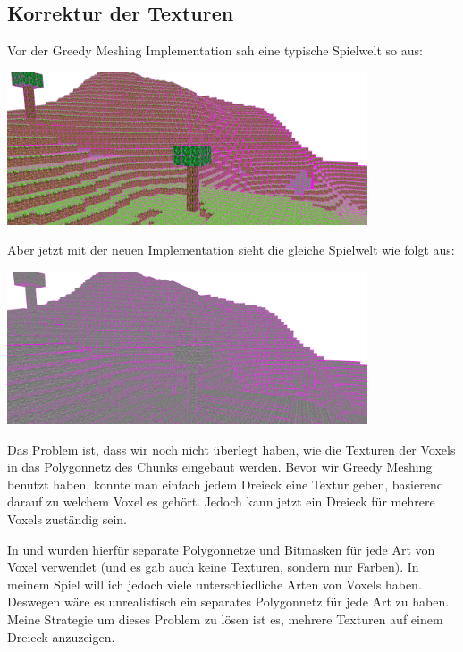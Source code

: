 \subsection{Korrektur der Texturen}

Vor der Greedy Meshing Implementation sah eine
typische Spielwelt so aus:

\begin{center}
\includegraphics[width=0.8\textwidth]{../assets/greedy/landscape_normal.png}
\end{center}

Aber jetzt mit der neuen Implementation
sieht die gleiche Spielwelt wie folgt aus:

\begin{center}
\includegraphics[width=0.8\textwidth]{../assets/greedy/landscape_stone_only.png}
\end{center}

Das Problem ist, dass wir noch nicht überlegt haben,
wie die Texturen der Voxels in das Polygonnetz des
Chunks eingebaut werden.
Bevor wir Greedy Meshing benutzt haben, konnte man
einfach jedem Dreieck eine Textur geben, basierend
darauf zu welchem Voxel es gehört.
Jedoch kann jetzt ein Dreieck für mehrere Voxels
zuständig sein.

In \cite{yt_bin_greedy_mesher} und
\cite{gh_bin_greedy_mesher} wurden hierfür separate
Polygonnetze und Bitmasken für jede Art von Voxel
verwendet (und es gab auch keine Texturen, sondern
nur Farben).
In meinem Spiel will ich jedoch viele unterschiedliche
Arten von Voxels haben. Deswegen wäre es unrealistisch
ein separates Polygonnetz für jede Art zu haben.
Meine Strategie um dieses Problem zu lösen ist es,
mehrere Texturen auf einem Dreieck anzuzeigen.

